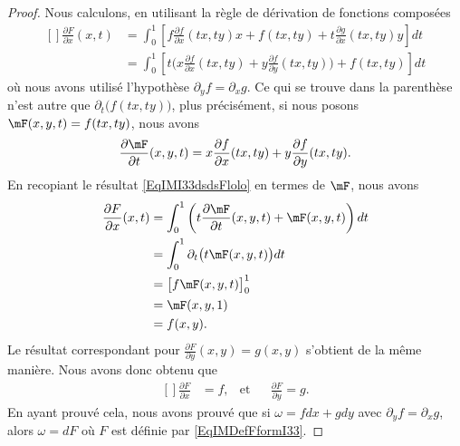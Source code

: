 \begin{proof}
	Nous calculons, en utilisant la règle de dérivation de fonctions composées
	\begin{equation}		\label{EqIMI33dsdsFlolo}
		\begin{aligned}[]
			\frac{ \partial F }{ \partial x }(x,t) & =\int_0^1\left[   f\frac{ \partial f }{ \partial x }(tx,ty)x+f(tx,ty)+t\frac{ \partial g }{ \partial x }(tx,ty)y  \right]dt         \\
			                                       & =\int_0^1\left[ t\Big( x\frac{ \partial f }{ \partial x }(tx,ty)+y\frac{ \partial f }{ \partial y }(tx,ty) \Big)+f(tx,ty) \right]dt
		\end{aligned}
	\end{equation}
	où nous avons utilisé l'hypothèse $\partial_yf=\partial_xg$. Ce qui se trouve dans la parenthèse n'est autre que $\partial_t\big( f(tx,ty) \big)$, plus précisément, si nous posons $\mF(x,y,t)=f(tx,ty)$, nous avons
	\begin{equation}
		\frac{ \partial \mF }{ \partial t }(x,y,t)= x\frac{ \partial f }{ \partial x }(tx,ty)+y\frac{ \partial f }{ \partial y }(tx,ty).
	\end{equation}
	En recopiant le résultat \eqref{EqIMI33dsdsFlolo} en termes de $\mF$, nous avons
	\begin{equation}
		\begin{aligned}[]
			\frac{ \partial F }{ \partial x }(x,t) & =\int_0^1\left( t\frac{ \partial \mF }{ \partial t }(x,y,t)+\mF(x,y,t) \right)dt \\
			                                       & =\int_0^1\partial_t\big( t\mF(x,y,t) \big)dt                                     \\
			                                       & =\big[ f\mF(x,y,t) \big]_0^1                                                     \\
			                                       & =\mF(x,y,1)                                                                      \\
			                                       & =f(x,y).
		\end{aligned}
	\end{equation}
	Le résultat correspondant pour $\frac{ \partial F }{ \partial y }(x,y)=g(x,y)$ s'obtient de la même manière. Nous avons donc obtenu que
	\begin{equation}		\label{EqIMFormI33Fffdd}
		\begin{aligned}[]
			\frac{ \partial F }{ \partial x } & =f, & \text{et} &  & \frac{ \partial F }{ \partial y }=g.
		\end{aligned}
	\end{equation}
	En ayant prouvé cela, nous avons prouvé que si $\omega=fdx+gdy$ avec $\partial_yf=\partial_xg$, alors $\omega=dF$ où $F$ est définie par \eqref{EqIMDefFformI33}.
\end{proof}

